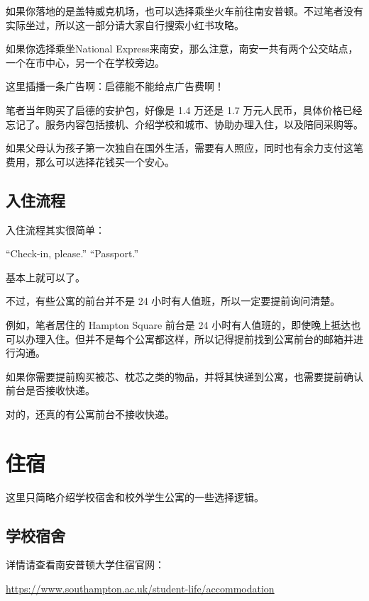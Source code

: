 \documentclass[UTF8,12pt,a4paper]{ctexart}
\begin{document}
如果你落地的是盖特威克机场，也可以选择乘坐火车前往南安普顿。不过笔者没有实际坐过，所以这一部分请大家自行搜索小红书攻略。

如果你选择乘坐National Express来南安，那么注意，南安一共有两个公交站点，一个在市中心，另一个在学校旁边。

这里插播一条广告啊：启德能不能给点广告费啊！

笔者当年购买了启德的安护包，好像是 1.4 万还是 1.7 万元人民币，具体价格已经忘记了。服务内容包括接机、介绍学校和城市、协助办理入住，以及陪同采购等。

如果父母认为孩子第一次独自在国外生活，需要有人照应，同时也有余力支付这笔费用，那么可以选择花钱买一个安心。

\subsection{入住流程}

入住流程其实很简单：

\begin{center}
    ``Check-in, please.'' \qquad ``Passport.''
\end{center}

基本上就可以了。

不过，有些公寓的前台并不是 24 小时有人值班，所以一定要提前询问清楚。

例如，笔者居住的 Hampton Square 前台是 24 小时有人值班的，即使晚上抵达也可以办理入住。但并不是每个公寓都这样，所以记得提前找到公寓前台的邮箱并进行沟通。

如果你需要提前购买被芯、枕芯之类的物品，并将其快递到公寓，也需要提前确认前台是否接收快递。

对的，还真的有公寓前台不接收快递。

\section{住宿}

这里只简略介绍学校宿舍和校外学生公寓的一些选择逻辑。

\subsection{学校宿舍}

详情请查看南安普顿大学住宿官网：

\begin{center}
    \url{https://www.southampton.ac.uk/student-life/accommodation}
\end{center}
\end{document}
